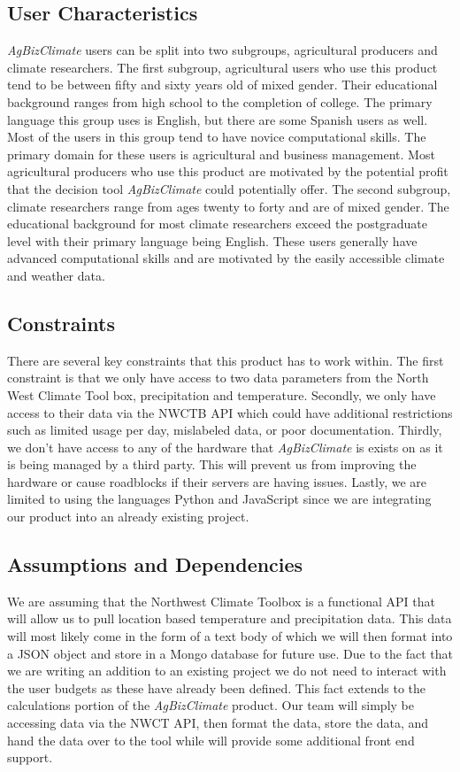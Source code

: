 \documentclass[onecolumn, draftclsnofoot,10pt, compsoc]{article}
\begin{document}
	\subsection{User Characteristics}
		\textit{AgBizClimate} users can be split into two subgroups, agricultural producers and climate researchers. The first subgroup, agricultural users who use this product tend to be between fifty and sixty years old of mixed gender. Their educational background ranges from high school to the completion of college. The primary language this group uses is English, but there are some Spanish users as well. Most of the users in this group tend to have novice computational skills. The primary domain for these users is agricultural and business management. Most agricultural producers who use this product are motivated by the potential profit that the decision tool \textit{AgBizClimate} could potentially offer. The second subgroup, climate researchers range from ages twenty to forty and are of mixed gender. The educational background for most climate researchers  exceed the postgraduate level with their primary language being English. These users generally have advanced computational skills and are motivated by the easily accessible climate and weather data.\\

	\subsection{Constraints}
		There are several key constraints that this product has to work within. The first constraint is that we only have access to two data parameters from the North West Climate Tool box, precipitation and temperature. Secondly, we only have access to their data via the NWCTB API which could have additional restrictions such as limited usage per day, mislabeled data, or poor documentation. Thirdly, we don’t have access to any of the hardware that \textit{AgBizClimate} is exists on as it is being managed by a third party. This will prevent us from improving the hardware or cause roadblocks if their servers are having issues. Lastly, we are limited to using the languages Python and JavaScript since we are integrating our product into an already existing project.\\

	\subsection {Assumptions and Dependencies}
		We are assuming that the Northwest Climate Toolbox is a functional API that will allow us to pull location based temperature and precipitation data. This data will most likely come in the form of a text body of which we will then format into a JSON object and store in a Mongo database for future use. Due to the fact that we are writing an addition to an existing project we do not need to interact with the user budgets as these have already been defined. This fact extends to the calculations portion of the \textit{AgBizClimate} product. Our team will simply be accessing data via the NWCT API, then format the data, store the data, and hand the data over to the tool while will provide some additional front end support.\\
\end{document}

